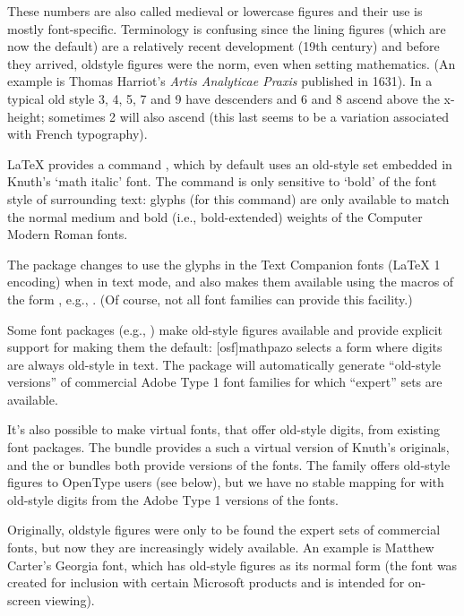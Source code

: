 These numbers are also called medieval or lowercase figures and their
use is mostly font-specific.  Terminology is confusing since the
lining figures (which are now the default) are a relatively recent
development (19th century) and before they arrived, oldstyle figures
were the norm, even when setting mathematics.  (An example is Thomas
Harriot's \emph{Artis Analyticae Praxis} published in 1631).  In a
typical old style 3, 4, 5, 7 and 9 have descenders and 6 and 8 ascend
above the x-height; sometimes 2 will also ascend (this last seems to
be a variation associated with French typography).

\LaTeX{} provides a command , which
by default uses an old-style set embedded in Knuth's `math italic'
font.  The command is only sensitive to `bold' of the font style of
surrounding text: glyphs (for this command) are only available to
match the normal medium and bold (i.e., bold-extended) weights of the
Computer Modern Roman fonts.

The  package changes  to use the
glyphs in the Text Companion fonts (\LaTeX{} 1 encoding) when
in text mode, and also makes them available using the macros of the
form , e.g., .
(Of course, not all font families can provide this facility.)

Some font packages (e.g., ) make old-style figures
available and provide explicit support for making them the default:
[osf]{mathpazo} selects a form where digits are
always old-style in text.  The  package will
automatically generate ``old-style versions'' of commercial Adobe Type
1 font families for which ``expert'' sets are available.

It's also possible to make virtual fonts, that offer old-style digits,
from existing font packages.  The  bundle provides
a such a virtual version of Knuth's originals, and the 
or  bundles both provide versions of the 
fonts.  The  family offers old-style figures to OpenType
users (see below), but we have no stable mapping for 
with old-style digits from the Adobe Type 1 versions of the fonts.

Originally, oldstyle figures were only to be found the expert sets of
commercial fonts, but now they are increasingly widely available.  An
example is Matthew Carter's Georgia font, which has old-style figures
as its normal form (the font was created for inclusion with certain
Microsoft products and is intended for on-screen viewing).

